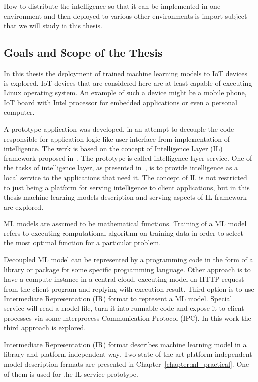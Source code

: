\documentclass[english, 12pt, a4paper, elec, utf8, online]{aaltothesis}
\begin{document}
How to distribute the intelligence so that it can be implemented in one environment and then deployed to various other environments is import subject that we will study in this thesis.

\subsection{Goals and Scope of the Thesis}
In this thesis the deployment of trained machine learning models to IoT devices is explored. IoT devices that are considered here are at least capable of executing Linux operating system. An example of such a device might be a mobile phone, IoT board with Intel processor for embedded applications or even a personal computer.

A prototype application was developed, in an attempt to decouple the code responsible for application logic like user interface from implementation of intelligence. The work is based on the concept of Intelligence Layer (IL) framework proposed in~\cite{edgar2019}. The prototype is called intelligence layer service. One of the tasks of intelligence layer, as presented in~\cite{edgar2019}, is to provide intelligence as a local service to the applications that need it. The concept of IL is not restricted to just being a platform for serving intelligence to client applications, but in this thesis machine learning models description and serving aspects of IL framework are explored. 

ML models are assumed to be mathematical functions. Training of a ML model refers to executing computational algorithm on training data in order to select the most optimal function for a particular problem. 

Decoupled ML model can be represented by a programming code in the form of a library or package for some specific programming language. Other approach is to have a compute instance in a central cloud, executing model on HTTP request from the client program and replying with execution result. Third option is to use Intermediate Representation (IR) format to represent a ML model. Special service will read a model file, turn it into runnable code and expose it to client processes via some Interprocess Communication Protocol (IPC). In this work the third approach is explored. 
        
Intermediate Representation (IR) format describes machine learning model in a library and platform independent way. Two state-of-the-art platform-independent model description formats are presented in Chapter~\ref{chapter:ml_practical}. One of them is used for the IL service prototype.    
\end{document}
